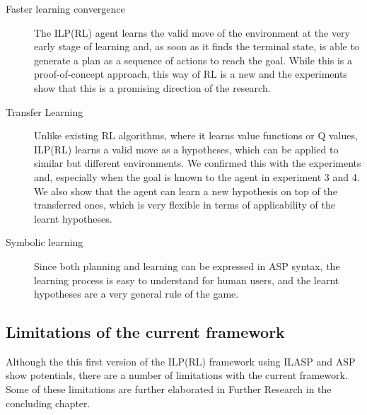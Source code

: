 \begin{description}
\item[Faster learning convergence]
The ILP(RL) agent learns the valid move of the environment at the very early stage of learning and, as soon as it finds the terminal state, is able to generate a plan as a sequence of actions to reach the goal.
While this is a proof-of-concept approach, this way of RL is a new and the experiments show that this is a promising direction of the research.

\item[Transfer Learning]
Unlike existing RL algorithms, where it learns value functions or Q values, ILP(RL) learns a valid move as a hypotheses, which can be applied to similar but different environments.
We confirmed this with the experiments and, especially when the goal is known to the agent in experiment 3 and 4.
We also show that the agent can learn a new hypothesis on top of the transferred ones, which is very flexible in terms of applicability of the learnt hypotheses.

\item[Symbolic learning]
Since both planning and learning can be expressed in ASP syntax, the learning process is easy to understand for human users, and the learnt hypotheses are a very general rule of the game.
\end{description} 



\subsection{Limitations of the current framework}
\label{subsec:limitations}
Although the this first version of the ILP(RL) framework using ILASP and ASP show potentials, there are a number of limitations with the current framework.
Some of these limitations are further elaborated in Further Research in the concluding chapter.

